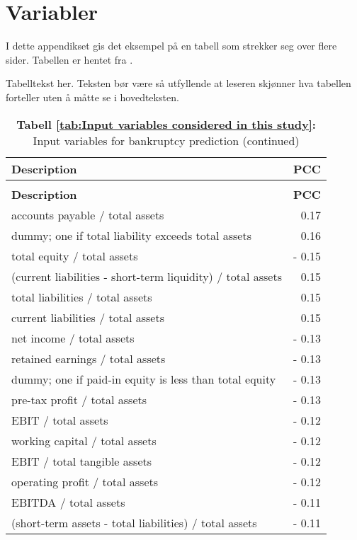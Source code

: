 \chapter{Variabler} \label{appendix:variabler}

I dette appendikset gis det eksempel på en tabell som strekker seg over flere sider. Tabellen er hentet fra \cite{paraschiv_bankruptcy_2021}.

\label{tab:Input variables considered in this study}
\caption*{Tabelltekst her. Teksten bør være så utfyllende at leseren skjønner hva tabellen forteller uten å måtte se i hovedteksten.}
\singlespacing
\begin{longtable}{l|r}
\textbf{Description}&\textbf{PCC}\\
\hline
\endfirsthead
\caption*{\textbf{Tabell \ref{tab:Input variables considered in this study}:} Input variables for bankruptcy prediction (continued)}\\
\addtocounter{table}{-1} 
\textbf{Description}&\textbf{PCC}\\
\hline
\endhead
\endfoot
\hline
    accounts payable / total assets & 0.17  \\
    dummy; one if total liability exceeds total assets & 0.16  \\
    total equity / total assets & - 0.15  \\
    (current liabilities - short-term liquidity) / total assets & 0.15  \\
    total liabilities / total assets & 0.15  \\
    current liabilities / total assets & 0.15  \\
    net income / total assets & - 0.13  \\
    retained earnings / total assets & - 0.13  \\
    dummy; one if paid-in equity is less than total equity & - 0.13  \\
    pre-tax profit / total assets & - 0.13  \\
    EBIT / total assets & - 0.12  \\
    working capital / total assets & - 0.12  \\
    EBIT / total tangible assets & - 0.12  \\
    operating profit / total assets & - 0.12  \\
    EBITDA / total assets & - 0.11  \\
    (short-term assets - total liabilities) / total assets & - 0.11  \\

\end{longtable}
